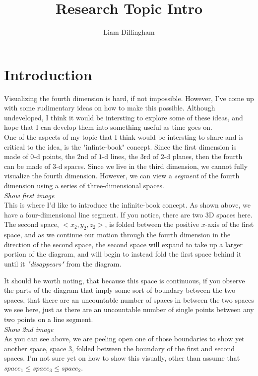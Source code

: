 \documentclass[20pt]{article} %
\title{Research Topic Intro}
\author{Liam Dillingham}
\begin{document}
\maketitle

\section{Introduction}
Visualizing the fourth dimension is hard, if not impossible.  However, I've come up with some rudimentary ideas on how to make this possible.  Although undeveloped, I think it would be intersting to explore some of these ideas, and hope that I can develop them into something useful as time goes on. \\ 

One of the aspects of my topic that I think would be intersting to share and is critical to the idea, is the "infinte-book" concept.  Since the first dimension is made of $0$-d points, the $2$nd of $1$-d lines, the $3$rd of $2$-d planes, then the fourth can be made of $3$-d spaces.  Since we live in the third dimension, we cannot fully visualize the fourth dimension. However, we can view a \textit{segment} of the fourth dimension using a series of three-dimensional spaces. \\

\textit{ Show first image} \\ 

This is where I'd like to introduce the infinite-book concept.  As shown above, we have a four-dimensional line segment. If you notice, there are two 3D spaces here.  
The second space, $<x_2, y_2, z_2>$, is folded between the positive $x$-axis of the first space, and as we continue our motion through the fourth dimension in the direction of the second space, the second space will expand to take up a larger portion of the diagram, and will begin to instead fold the first space behind it until it \textit{"disappears"} from the diagram.

It should be worth noting, that because this space is continuous, if you observe the parts of the diagram that imply some sort of boundary between the two spaces, that there are an uncountable number of spaces in between the two spaces we see here, just as there are an uncountable number of single points between any two points on a line segment. \\ 

\textit{ Show 2nd image} \\ 

As you can see above, we are peeling open one of those boundaries to show yet another space, space $3$, folded between the boundary of the first and second spaces.  I'm not sure yet on how to show this visually, other than assume that $space_1 \leq space_3 \leq space_2$. \\ 
\end{document}
